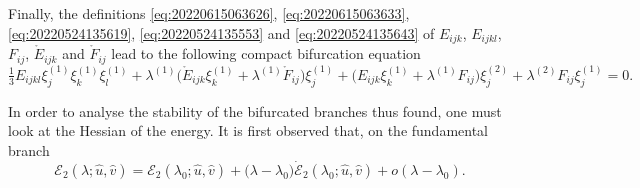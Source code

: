 \documentclass[12pt, final]{scrartcl}
\theoremstyle{definition}
\newcommand{\E}{\mathcal E}
\newcommand{\order}[2][1]{#2^{(#1)}}
\begin{document}

Finally, the definitions \eqref{eq:20220615063626}, \eqref{eq:20220615063633}, \eqref{eq:20220524135619},
\eqref{eq:20220524135553} and \eqref{eq:20220524135643} of $E_{ijk}$, $E_{ijkl}$, $F_{ij}$, $\mathring{E}_{ijk}$ and
$\mathring{F}_{ij}$ lead to the following compact bifurcation equation
\begin{equation}
  \label{eq:20220601070917}
  \tfrac{1}{3} E_{ijkl} \order[1]{\xi_j} \order[1]{\xi_k} \order[1]{\xi_l} + \order[1]\lambda \bigl( \mathring{E}_{ijk} \order[1]{\xi_k} + \order[1]\lambda \mathring{F}_{ij} \bigr)\order[1]{\xi_j} + \bigl(E_{ijk} \order[1]{\xi_k} + \order[1]\lambda F_{ij}\bigr) \order[2]{\xi_j} + \order[2]\lambda F_{ij} \order[1]{\xi_j} = 0.
\end{equation}

In order to analyse the stability of the bifurcated branches thus found, one must look at the Hessian of the energy. It
is first observed that, on the fundamental branch
\begin{equation}
 \E_2(\lambda; \hat{u}, \hat{v}) = \E_2(\lambda_0; \hat{u}, \hat{v}) + \bigl(\lambda - \lambda_0\bigr) \dot{\E}_2(\lambda_0; \hat{u}, \hat{v}) + o(\lambda - \lambda_0).
\end{equation}
\end{document}
